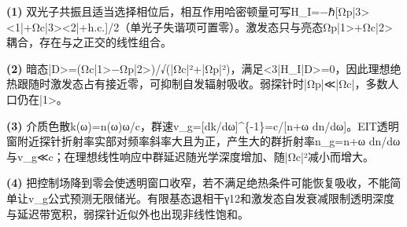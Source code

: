 \par\noindent\textbf{(1)} 双光子共振且适当选择相位后，相互作用哈密顿量可写H\_I=−ℏ[Ωp|3><1|+Ωc|3><2|+h.c.]/2（单光子失谐项可置零）。激发态只与亮态Ωp|1>+Ωc|2>耦合，存在与之正交的线性组合。
\par\noindent\textbf{(2)} 暗态|D>=(Ωc|1>−Ωp|2>)/√(|Ωc|²+|Ωp|²)，满足<3|H\_I|D>=0，因此理想绝热跟随时激发态占有接近零，可抑制自发辐射吸收。弱探针时|Ωp|≪|Ωc|，多数人口仍在|1>。
\par\noindent\textbf{(3)} 介质色散k(ω)=n(ω)ω/c，群速v\_g=[dk/dω]\textasciicircum{}\{-1\}=c/[n+ω dn/dω]。EIT透明窗附近探针折射率实部对频率斜率大且为正，产生大的群折射率n\_g=n+ω dn/dω与v\_g≪c；在理想线性响应中群延迟随光学深度增加、随|Ωc|²减小而增大。
\par\noindent\textbf{(4)} 把控制场降到零会使透明窗口收窄，若不满足绝热条件可能恢复吸收，不能简单让v\_g公式预测无限储光。有限基态退相干γ12和激发态自发衰减限制透明深度与延迟带宽积，弱探针近似外也出现非线性饱和。
